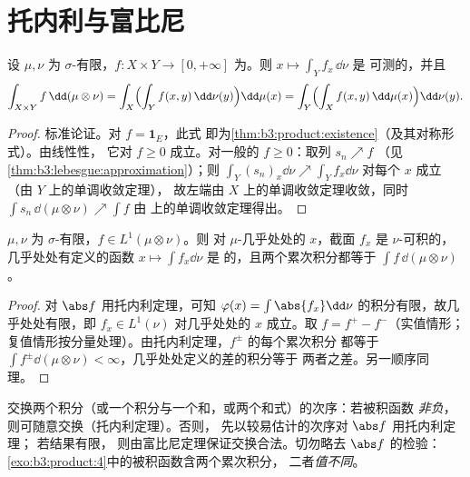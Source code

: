 \section{托内利与富比尼}

\begin{theorem}[托内利]\label{thm:b3:product:tonelli}
设 $\mu, \nu$ 为 $\sigma$-有限，$f \colon X\times Y \to [0,
+\infty]$ 为。则 $x \mapsto \int_Y f_x\,\dd\nu$ 是
可测的，并且
\[
\int_{X\times Y}f\,\dd(\mu\otimes\nu)
= \int_X\Bigl(\int_Y f(x,y)\,\dd\nu(y)\Bigr)\dd\mu(x)
= \int_Y\Bigl(\int_X f(x,y)\,\dd\mu(x)\Bigr)\dd\nu(y).
\]
\end{theorem}

\begin{proof}
标准论证。对 $f = \mathbf 1_E$，此式
即为\cref{thm:b3:product:existence}（及其对称形式）。由线性性，
它对 $f \geq 0$ 成立。对一般的 $f \geq
0$：取列 $s_n \nearrow f$
（见\cref{thm:b3:lebesgue:approximation}）；则 $\int_Y(s_n)_x
\dd\nu \nearrow \int_Y f_x\dd\nu$ 对每个 $x$ 成立（由 $Y$ 上的单调收敛定理），
故左端由 $X$ 上的单调收敛定理收敛，同时
$\int s_n\,\dd(\mu\otimes\nu) \nearrow \int f$ 由
上的单调收敛定理得出。
\end{proof}

\begin{theorem}[富比尼]\label{thm:b3:product:fubini}
$\mu, \nu$ 为 $\sigma$-有限，$f \in L^1(\mu\otimes\nu)$。则
对 $\mu$-几乎处处的 $x$，截面 $f_x$ 是 $\nu$-可积的，
几乎处处有定义的函数 $x \mapsto \int f_x\dd\nu$ 是
的，且两个累次积分都等于
$\int f\,\dd(\mu\otimes\nu)$。
\end{theorem}

\begin{proof}
对 $\abs f$ 用托内利定理，可知 $\varphi(x) = \int\abs{f_x}
\dd\nu$ 的积分有限，故几乎处处有限，即 $f_x \in
L^1(\nu)$ 对几乎处处的 $x$ 成立。取 $f = f^+ - f^-$（实值情形；
复值情形按分量处理）。由托内利定理，$f^\pm$ 的每个累次积分
都等于 $\int f^\pm\dd(\mu\otimes\nu) <
\infty$，几乎处处定义的差的积分等于
两者之差。另一顺序同理。
\end{proof}

\begin{method}\label{met:b3:product:fubini}
交换两个积分（或一个积分与一个和，或两个和式）的次序：若被积函数
\emph{非负}，则可随意交换（托内利定理）。否则，
先以较易估计的次序对 $\abs f$ 用托内利定理；
若结果有限，
则由富比尼定理保证交换合法。切勿略去
$\abs f$ 的检验：\cref{exo:b3:product:4}中的被积函数含两个累次积分，
二者\emph{值不同}。
\end{method}

